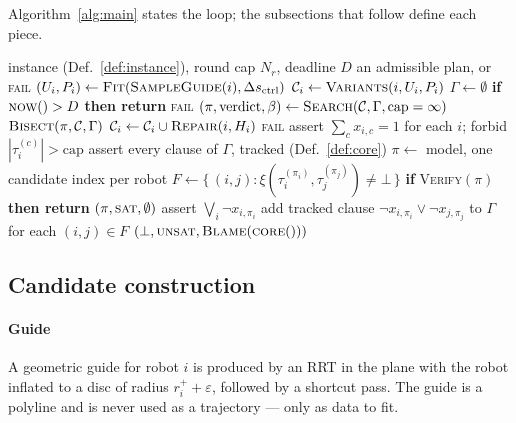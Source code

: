 \documentclass[conference]{IEEEtran}
\newcommand{\Rob}{\mathcal{R}}
\newcommand{\Cand}{\mathcal{C}}
\newcommand{\clr}{\varepsilon}
\begin{document}
Algorithm~\ref{alg:main} states the loop; the subsections that follow define each piece.

\begin{algorithm}[t]
\caption{Core-guided B-spline coordination}
\label{alg:main}
\begin{algorithmic}[1]
\Require instance (Def.~\ref{def:instance}), round cap $N_r$, deadline $D$
\Ensure an admissible plan, or \textsc{fail}
\For{$i \in \Rob$}
  \State $(U_i, P_i) \gets \textsc{Fit}(\textsc{SampleGuide}(i), \Delta s_{\text{ctrl}})$
  \State $\Cand_i \gets \textsc{Variants}(i, U_i, P_i)$
\EndFor
\State $\Gamma \gets \emptyset$ 
  \State \textbf{if} $\textsc{now}() > D$ \textbf{then return} \textsc{fail}
  \State $(\pi, \text{verdict}, \beta) \gets \textsc{Search}(\Cand, \Gamma, \text{cap}=\infty)$
    \State \Return $\textsc{Bisect}(\pi, \Cand, \Gamma)$
  \EndIf
   
    \State $\Cand_i \gets \Cand_i \cup \textsc{Repair}(i, H_i)$
  \EndFor
\EndFor
\State \Return \textsc{fail}
\Statex
\Function{Search}{$\Cand, \Gamma, \text{cap}$}
  \State assert $\sum_{c} x_{i,c} = 1$ for each $i$; forbid $|\tau_i^{(c)}| > \text{cap}$
  \State assert every clause of $\Gamma$, tracked (Def.~\ref{def:core})
    \State $\pi \gets$ model, one candidate index per robot
    \State $F \gets \{\,(i,j) : \xi(\tau_i^{(\pi_i)}, \tau_j^{(\pi_j)}) \neq \bot \,\}$
      \State \textbf{if} \textsc{Verify}$(\pi)$ \textbf{then return} $(\pi,\textsc{sat},\emptyset)$
      \State assert $\bigvee_i \neg x_{i,\pi_i}$ 
    \Else
      \State add tracked clause $\neg x_{i,\pi_i} \vee \neg x_{j,\pi_j}$ to $\Gamma$
             for each $(i,j) \in F$
    \EndIf
  \EndWhile
  \State \Return $(\bot, \textsc{unsat}, \textsc{Blame}(\textsc{core}()))$
\EndFunction
\end{algorithmic}
\end{algorithm}

\subsection{Candidate construction}
\label{sec:candidates}

\paragraph*{Guide}
A geometric guide for robot $i$ is produced by an RRT in the plane with the robot inflated
to a disc of radius $r^{+}_i + \clr$, followed by a shortcut pass. The guide is a polyline
and is never used as a trajectory --- only as data to fit.
\end{document}
